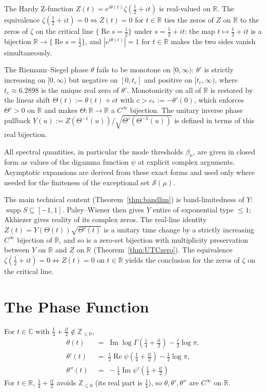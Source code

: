 \documentclass[11pt]{article}
\DeclareMathOperator{\ImOp}{Im}
\DeclareMathOperator{\ReOp}{Re}
\let\Im\ImOp
\let\Re\ReOp
\DeclareMathOperator{\supp}{supp}
\begin{document}
The Hardy Z-function $Z(t) = e^{i\theta(t)}\zeta(\tfrac{1}{2}+it)$ is real-valued on $\mathbb{R}$. The equivalence $\zeta(\tfrac{1}{2}+it)=0 \iff Z(t)=0$ for $t\in\mathbb{R}$ ties the zeros of $Z$ on $\mathbb{R}$ to the zeros of $\zeta$ on the critical line $\{\Re s=\tfrac{1}{2}\}$ under $s=\tfrac{1}{2}+it$: the map $t\mapsto\tfrac{1}{2}+it$ is a bijection $\mathbb{R}\to\{\Re s=\tfrac{1}{2}\}$, and $|e^{i\theta(t)}|=1$ for $t\in\mathbb{R}$ makes the two sides vanish simultaneously.

The Riemann--Siegel phase $\theta$ fails to be monotone on $[0,\infty)$: $\theta'$ is strictly increasing on $[0,\infty)$ but negative on $[0,t_c]$ and positive on $[t_c,\infty)$, where $t_c\approx 6.2898$ is the unique real zero of $\theta'$. Monotonicity on all of $\mathbb{R}$ is restored by the linear shift $\Theta(t):=\theta(t)+ct$ with $c>c_*:=-\theta'(0)$, which enforces $\Theta'>0$ on $\mathbb{R}$ and makes $\Theta:\mathbb{R}\to\mathbb{R}$ a $C^\infty$ bijection. The unitary inverse phase pullback $Y(u):=Z(\Theta^{-1}(u))/\sqrt{\Theta'(\Theta^{-1}(u))}$ is defined in terms of this real bijection.

All spectral quantities, in particular the mode thresholds $\beta_n$, are given in closed form as values of the digamma function $\psi$ at explicit complex arguments. Asymptotic expansions are derived from these exact forms and used only where needed for the finiteness of the exceptional set $\mathcal{S}(\mu)$.

The main technical content (Theorem~\ref{thm:bandlim}) is band-limitedness of $Y$: $\supp S\subseteq[-1,1]$. Paley--Wiener then gives $Y$ entire of exponential type $\le 1$; Akhiezer gives reality of its complex zeros. The real-line identity $Z(t)=Y(\Theta(t))\sqrt{\Theta'(t)}$ is a unitary time change by a strictly increasing $C^\infty$ bijection of $\mathbb{R}$, and so is a zero-set bijection with multiplicity preservation between $Y$ on $\mathbb{R}$ and $Z$ on $\mathbb{R}$ (Theorem~\ref{thm:UTCzero}). The equivalence $\zeta(\tfrac{1}{2}+it)=0 \iff Z(t)=0$ on $t\in\mathbb{R}$ yields the conclusion for the zeros of $\zeta$ on the critical line.

\section{The Phase Function}

For $t\in\mathbb{C}$ with $\tfrac{1}{4}+\tfrac{it}{2}\notin\mathbb{Z}_{\le 0}$,
\begin{align}
\theta(t) &\;=\; \Im\log\Gamma\!\left(\tfrac{1}{4}+\tfrac{it}{2}\right) - \tfrac{t}{2}\log\pi, \label{eq:theta}\\
\theta'(t) &\;=\; \tfrac{1}{2}\Re\psi\!\left(\tfrac{1}{4}+\tfrac{it}{2}\right) - \tfrac{1}{2}\log\pi, \label{eq:thetap}\\
\theta''(t) &\;=\; -\tfrac{1}{4}\Im\psi'\!\left(\tfrac{1}{4}+\tfrac{it}{2}\right) \label{eq:thetapp}
\end{align}
For $t\in\mathbb{R}$, $\tfrac{1}{4}+\tfrac{it}{2}$ avoids $\mathbb{Z}_{\le 0}$ (its real part is $\tfrac{1}{4}$), so $\theta,\theta',\theta''$ are $C^\infty$ on $\mathbb{R}$.
\end{document}
